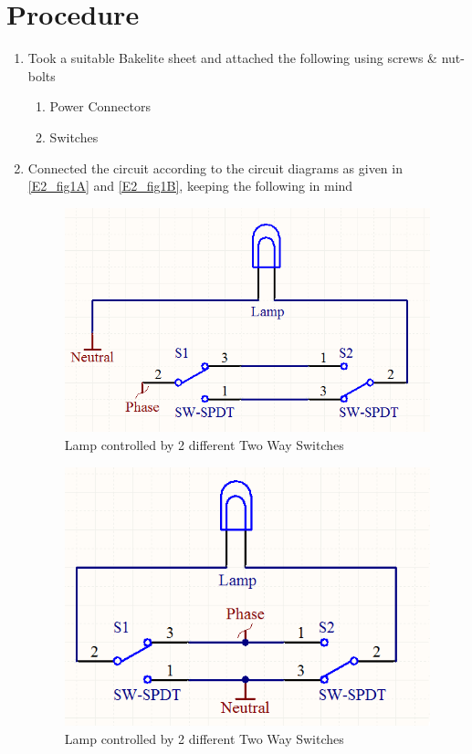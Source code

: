 \section{Procedure}
	\begin{enumerate}
		\item Took a suitable Bakelite sheet and attached the following using screws \& nut-bolts
			\begin{enumerate}
				\item Power Connectors
				\item Switches
			\end{enumerate} 
		\item Connected the circuit according to the circuit diagrams as given in \autoref{E2_fig1A} and \autoref{E2_fig1B}, keeping the following in mind
		\begin{figure}[bth]
			\begin{center}
				\includegraphics[width=.8\linewidth]{gfx/circuit2_A}
			\end{center}
		\caption[Lamp - 2 Two Way Switch - Method 1]{Lamp controlled by 2 different Two Way Switches}\label{E2_fig1A}
		\end{figure}

		\begin{figure}[bth]
			\begin{center}
				\includegraphics[width=.8\linewidth]{gfx/circuit2_B}
			\end{center}
		\caption[Lamp - 2 Two Way Switch - Method 2]{Lamp controlled by 2 different Two Way Switches}\label{E2_fig1B}
		\end{figure}


\end{enumerate}
